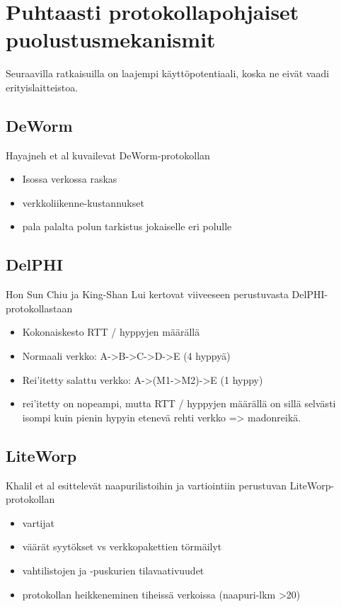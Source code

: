 \documentclass[finnish]{tktltiki2}
\theoremstyle{definition}
\theoremstyle{remark}
\begin{document}
\section{Puhtaasti protokollapohjaiset puolustusmekanismit}
Seuraavilla ratkaisuilla on laajempi käyttöpotentiaali, koska ne eivät vaadi erityislaitteistoa.

\subsection{DeWorm}

Hayajneh et al kuvailevat DeWorm-protokollan \cite{deworm}

\begin{itemize}
\item Isossa verkossa raskas
\item verkkoliikenne-kustannukset
\item pala palalta polun tarkistus jokaiselle eri polulle
\end{itemize}

\subsection{DelPHI}

Hon Sun Chiu ja King-Shan Lui kertovat viiveeseen perustuvasta DelPHI-protokollastaan \cite{delphi}

\begin{itemize}
\item Kokonaiskesto RTT / hyppyjen määrällä
\item Normaali verkko: A->B->C->D->E (4 hyppyä) 
\item Rei'itetty salattu verkko: A->(M1->M2)->E (1 hyppy)
\item rei'itetty on nopeampi, mutta RTT / hyppyjen määrällä on sillä selvästi isompi kuin pienin hypyin etenevä rehti verkko => madonreikä.
\end{itemize}

\subsection{LiteWorp}

Khalil et al esittelevät naapurilistoihin ja vartiointiin perustuvan LiteWorp-protokollan \cite{liteworp}

\begin{itemize}
\item vartijat
\item väärät syytökset vs verkkopakettien törmäilyt
\item vahtilistojen ja -puskurien tilavaativuudet
\item protokollan heikkeneminen tiheissä verkoissa (naapuri-lkm >20)
\end{itemize}
\end{document}
